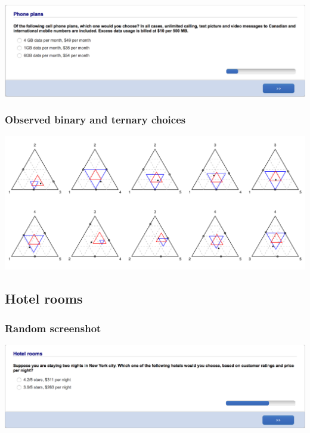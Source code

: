 \documentclass[11pt,letter]{article}
\begin{document}
\includegraphics[width=15cm]{Population_study_design/screenshot_Phone_Plans.png}

\subsubsection*{Observed binary and ternary choices}

\includegraphics[width=15cm]{./Population_study_data/Simplexes/Phone_plans.pdf}

\pagebreak

\subsection{Hotel rooms}



\subsubsection*{Random screenshot}

\includegraphics[width=15cm]{Population_study_design/screenshot_Hotel_Rooms.png}
\end{document}
